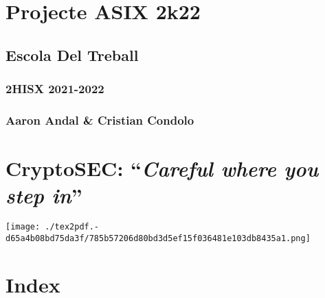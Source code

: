 \documentclass[]{article}
\date{}
\begin{document}
\hypertarget{projecte-asix-2k22}{%
\section{\texorpdfstring{\textbf{Projecte ASIX
2k22}}{Projecte ASIX 2k22}}\label{projecte-asix-2k22}}

\hypertarget{escola-del-treball}{%
\subsection{\texorpdfstring{\textbf{Escola Del
Treball}}{Escola Del Treball}}\label{escola-del-treball}}

\hypertarget{hisx-2021-2022}{%
\subsubsection{\texorpdfstring{\textbf{2HISX
2021-2022}}{2HISX 2021-2022}}\label{hisx-2021-2022}}

\hypertarget{aaron-andal-cristian-condolo}{%
\subsubsection{\texorpdfstring{\textbf{Aaron Andal \& Cristian
Condolo}}{Aaron Andal \& Cristian Condolo}}\label{aaron-andal-cristian-condolo}}

\hypertarget{cryptosec-careful-where-you-step-in}{%
\section{\texorpdfstring{\textbf{CryptoSEC}: ``\emph{Careful where you
step
in}''}{CryptoSEC: ``Careful where you step in''}}\label{cryptosec-careful-where-you-step-in}}

\texttt{[image: ./tex2pdf.-d65a4b08bd75da3f/785b57206d80bd3d5ef15f036481e103db8435a1.png]}

\hypertarget{index}{%
\section{\texorpdfstring{\textbf{Index}}{Index}}\label{index}}
\end{document}
